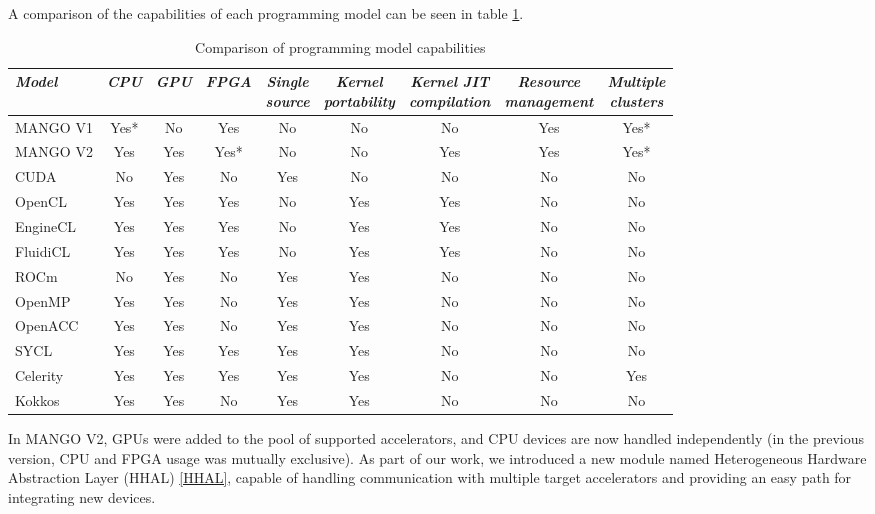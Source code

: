 A comparison of the capabilities of each programming model can be seen in table \ref{tab:progamming-model-comparison}.

\begin{table}[ht]
    \centering
    \begin{tabular}{l|c|c|c|c|c|c|c|c}
    \textit{Model} & \textit{CPU} & \textit{GPU} & \textit{FPGA} & \makecell{\textit{Single} \\ \textit{source}} & \makecell{\textit{Kernel} \\ \textit{portability}} & \makecell{\textit{Kernel JIT} \\ \textit{compilation}} & \makecell{\textit{Resource} \\ \textit{management}} & \makecell{\textit{Multiple} \\ \textit{clusters}} \\ \hline
    MANGO V1 & Yes* & No & Yes & No & No & No & Yes & Yes* \\
    MANGO V2 & Yes & Yes & Yes* & No & No & Yes & Yes & Yes* \\
    CUDA & No & Yes & No & Yes & No & No & No & No \\
    OpenCL & Yes & Yes & Yes & No & Yes & Yes & No & No \\
    EngineCL & Yes & Yes & Yes & No & Yes & Yes & No & No \\
    FluidiCL & Yes & Yes & Yes & No & Yes & Yes & No & No \\
    ROCm & No & Yes & No & Yes & Yes & No & No & No \\
    OpenMP & Yes & Yes & No & Yes & Yes & No & No & No  \\
    OpenACC & Yes & Yes & No & Yes & Yes & No & No & No  \\
    SYCL & Yes & Yes & Yes & Yes & Yes & No & No & No \\
    Celerity & Yes & Yes & Yes & Yes & Yes & No & No & Yes \\
    Kokkos & Yes & Yes & No & Yes & Yes & No & No & No 
    \end{tabular}
    \captionsetup{justification=centering}
    \caption{Comparison of programming model capabilities}
    \label{tab:progamming-model-comparison}
\end{table}

In MANGO V2, GPUs were added to the pool of supported accelerators, and CPU devices are now handled independently (in the previous version, CPU and FPGA usage was mutually exclusive).
As part of our work, we introduced a new module named Heterogeneous Hardware Abstraction Layer (HHAL) \ref{HHAL}, capable of handling communication with multiple target accelerators and providing an easy path for integrating new devices.

